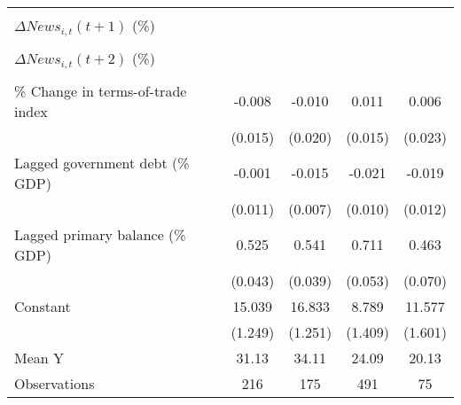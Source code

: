 {\begin{tabular}{l*{4}{c}}
                    &                     &                     &                     &                     \\
\addlinespace
$ \Delta News_{i,t}(t+1)$ (\%)&                     &                     &                     &                     \\
                    &                     &                     &                     &                     \\
\addlinespace
$ \Delta News_{i,t}(t+2)$ (\%)&                     &                     &                     &                     \\
                    &                     &                     &                     &                     \\
\addlinespace
\% Change in terms-of-trade index&      -0.008         &      -0.010         &       0.011         &       0.006         \\
                    &     (0.015)         &     (0.020)         &     (0.015)         &     (0.023)         \\
\addlinespace
Lagged government debt (\% GDP)&      -0.001         &      -0.015\sym{**} &      -0.021\sym{**} &      -0.019         \\
                    &     (0.011)         &     (0.007)         &     (0.010)         &     (0.012)         \\
\addlinespace
Lagged primary balance (\% GDP)&       0.525\sym{***}&       0.541\sym{***}&       0.711\sym{***}&       0.463\sym{***}\\
                    &     (0.043)         &     (0.039)         &     (0.053)         &     (0.070)         \\
\addlinespace
Constant            &      15.039\sym{***}&      16.833\sym{***}&       8.789\sym{***}&      11.577\sym{***}\\
                    &     (1.249)         &     (1.251)         &     (1.409)         &     (1.601)         \\
\midrule
Mean Y              &       31.13         &       34.11         &       24.09         &       20.13         \\
Observations        &         216         &         175         &         491         &          75         \\
\bottomrule
\end{tabular}
}
